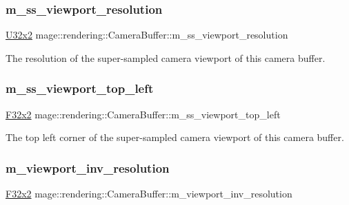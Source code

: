 \subsubsection{\texorpdfstring{m\+\_\+ss\+\_\+viewport\+\_\+resolution}{m\_ss\_viewport\_resolution}}
{\footnotesize\ttfamily \mbox{\hyperlink{namespacemage_a31f2bb52b5080e706e1c13de07c0a249}{U32x2}} mage\+::rendering\+::\+Camera\+Buffer\+::m\+\_\+ss\+\_\+viewport\+\_\+resolution}

The resolution of the super-\/sampled camera viewport of this camera buffer. \mbox{\label{structmage_1_1rendering_1_1_camera_buffer_a7410f2408daa4e4a69e145eb8d31a2d7}} 
\subsubsection{\texorpdfstring{m\+\_\+ss\+\_\+viewport\+\_\+top\+\_\+left}{m\_ss\_viewport\_top\_left}}
{\footnotesize\ttfamily \mbox{\hyperlink{namespacemage_a9dc0d34d6ecc87e4cfa4a826102117bc}{F32x2}} mage\+::rendering\+::\+Camera\+Buffer\+::m\+\_\+ss\+\_\+viewport\+\_\+top\+\_\+left}

The top left corner of the super-\/sampled camera viewport of this camera buffer. \mbox{\label{structmage_1_1rendering_1_1_camera_buffer_a6ba4a1f638f1ace9021b75773265b8a3}} 
\subsubsection{\texorpdfstring{m\+\_\+viewport\+\_\+inv\+\_\+resolution}{m\_viewport\_inv\_resolution}}
{\footnotesize\ttfamily \mbox{\hyperlink{namespacemage_a9dc0d34d6ecc87e4cfa4a826102117bc}{F32x2}} mage\+::rendering\+::\+Camera\+Buffer\+::m\+\_\+viewport\+\_\+inv\+\_\+resolution}

